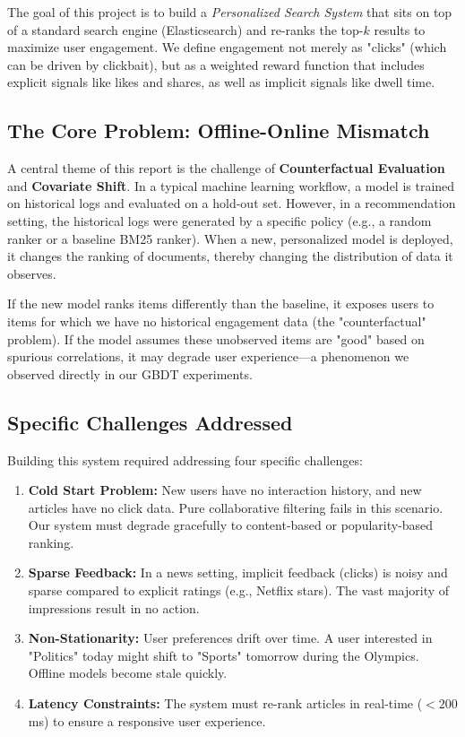 \documentclass[11pt,a4paper]{article}
\begin{document}
The goal of this project is to build a \textit{Personalized Search System} that sits on top of a standard search engine (Elasticsearch) and re-ranks the top-$k$ results to maximize user engagement. We define engagement not merely as "clicks" (which can be driven by clickbait), but as a weighted reward function that includes explicit signals like likes and shares, as well as implicit signals like dwell time.

\subsection{The Core Problem: Offline-Online Mismatch}
A central theme of this report is the challenge of \textbf{Counterfactual Evaluation} and \textbf{Covariate Shift}. In a typical machine learning workflow, a model is trained on historical logs and evaluated on a hold-out set. However, in a recommendation setting, the historical logs were generated by a specific policy (e.g., a random ranker or a baseline BM25 ranker). When a new, personalized model is deployed, it changes the ranking of documents, thereby changing the distribution of data it observes.

If the new model ranks items differently than the baseline, it exposes users to items for which we have no historical engagement data (the "counterfactual" problem). If the model assumes these unobserved items are "good" based on spurious correlations, it may degrade user experience—a phenomenon we observed directly in our GBDT experiments.

\subsection{Specific Challenges Addressed}
Building this system required addressing four specific challenges:
\begin{enumerate}
    \item \textbf{Cold Start Problem:} New users have no interaction history, and new articles have no click data. Pure collaborative filtering fails in this scenario. Our system must degrade gracefully to content-based or popularity-based ranking.
    \item \textbf{Sparse Feedback:} In a news setting, implicit feedback (clicks) is noisy and sparse compared to explicit ratings (e.g., Netflix stars). The vast majority of impressions result in no action.
    \item \textbf{Non-Stationarity:} User preferences drift over time. A user interested in "Politics" today might shift to "Sports" tomorrow during the Olympics. Offline models become stale quickly.
    \item \textbf{Latency Constraints:} The system must re-rank articles in real-time ($<200$ms) to ensure a responsive user experience.
\end{enumerate}
\end{document}

